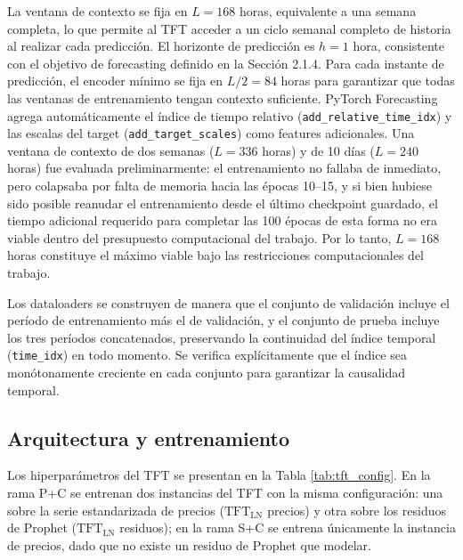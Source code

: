 La ventana de contexto se fija en $L = 168$ horas, equivalente a una semana completa, lo que permite al TFT acceder a un ciclo semanal completo de historia al realizar cada predicción. El horizonte de predicción es $h = 1$ hora, consistente con el objetivo de forecasting definido en la Sección 2.1.4. Para cada instante de predicción, el encoder mínimo se fija en $L/2 = 84$ horas para garantizar que todas las ventanas de entrenamiento tengan contexto suficiente. PyTorch Forecasting agrega automáticamente el índice de tiempo relativo (\texttt{add\_relative\_time\_idx}) y las escalas del target (\texttt{add\_target\_scales}) como features adicionales. Una ventana de contexto de dos semanas ($L = 336$ horas) y de 10 días ($L = 240$ horas) fue evaluada preliminarmente: el entrenamiento no fallaba de inmediato, pero colapsaba por falta de memoria hacia las épocas 10--15, y si bien hubiese sido posible reanudar el entrenamiento desde el último checkpoint guardado, el tiempo adicional requerido para completar las 100 épocas de esta forma no era viable dentro del presupuesto computacional del trabajo. Por lo tanto, $L = 168$ horas constituye el máximo viable bajo las restricciones computacionales del trabajo.

Los dataloaders se construyen de manera que el conjunto de validación incluye el período de entrenamiento más el de validación, y el conjunto de prueba incluye los tres períodos concatenados, preservando la continuidad del índice temporal (\texttt{time\_idx}) en todo momento. Se verifica explícitamente que el índice sea monótonamente creciente en cada conjunto para garantizar la causalidad temporal.

\subsection{Arquitectura y entrenamiento}

Los hiperparámetros del TFT se presentan en la Tabla \ref{tab:tft_config}. En la rama P+C se entrenan dos instancias del TFT con la misma configuración: una sobre la serie estandarizada de precios ($\text{TFT}_\text{LN}$ precios) y otra sobre los residuos de Prophet ($\text{TFT}_\text{LN}$ residuos); en la rama S+C se entrena únicamente la instancia de precios, dado que no existe un residuo de Prophet que modelar.

